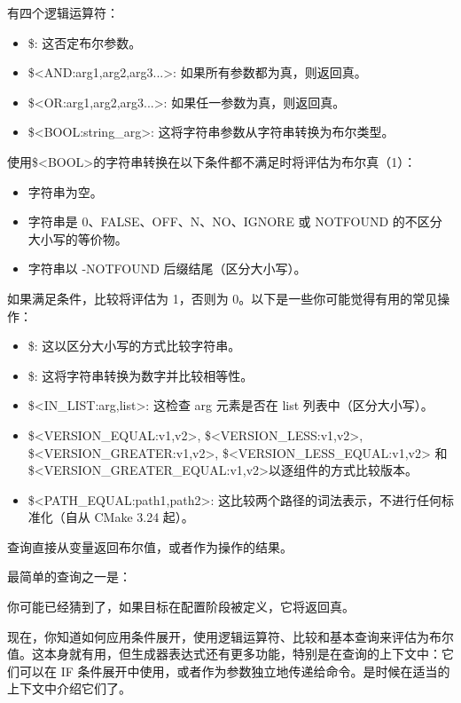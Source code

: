 有四个逻辑运算符：

\begin{itemize}
\item
\$<NOT:arg>: 这否定布尔参数。

\item
\$<AND:arg1,arg2,arg3...>: 如果所有参数都为真，则返回真。

\item
\$<OR:arg1,arg2,arg3...>: 如果任一参数为真，则返回真。

\item
\$<BOOL:string\_arg>: 这将字符串参数从字符串转换为布尔类型。
\end{itemize}

使用\$<BOOL>的字符串转换在以下条件都不满足时将评估为布尔真（1）：

\begin{itemize}
\item
字符串为空。

\item
字符串是 0、FALSE、OFF、N、NO、IGNORE 或 NOTFOUND 的不区分大小写的等价物。

\item
字符串以 -NOTFOUND 后缀结尾（区分大小写）。
\end{itemize}


如果满足条件，比较将评估为 1，否则为 0。以下是一些你可能觉得有用的常见操作：

\begin{itemize}
\item
\$<STREQUAL:arg1,arg2>: 这以区分大小写的方式比较字符串。

\item
\$<EQUAL:arg1,arg2>: 这将字符串转换为数字并比较相等性。

\item
\$<IN\_LIST:arg,list>: 这检查 arg 元素是否在 list 列表中（区分大小写）。

\item
\$<VERSION\_EQUAL:v1,v2>, \$<VERSION\_LESS:v1,v2>, \$<VERSION\_GREATER:v1,v2>, \$<VERSION\_LESS\_EQUAL:v1,v2> 和 \$<VERSION\_GREATER\_EQUAL:v1,v2>以逐组件的方式比较版本。

\item
\$<PATH\_EQUAL:path1,path2>: 这比较两个路径的词法表示，不进行任何标准化（自从 CMake 3.24 起）。
\end{itemize}


查询直接从变量返回布尔值，或者作为操作的结果。

最简单的查询之一是：


你可能已经猜到了，如果目标在配置阶段被定义，它将返回真。

现在，你知道如何应用条件展开，使用逻辑运算符、比较和基本查询来评估为布尔值。这本身就有用，但生成器表达式还有更多功能，特别是在查询的上下文中：它们可以在 IF 条件展开中使用，或者作为参数独立地传递给命令。是时候在适当的上下文中介绍它们了。



